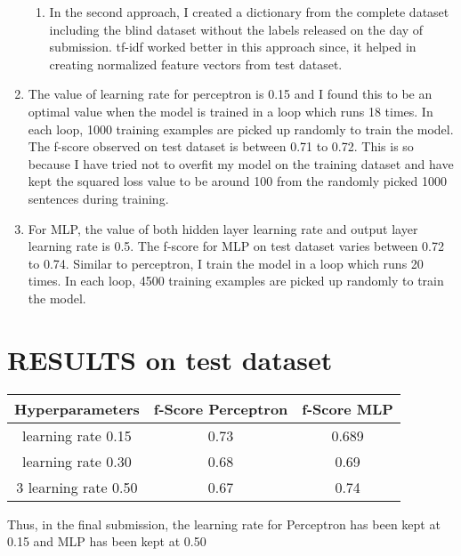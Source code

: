 \documentclass[12pt]{article}
\begin{document}
\begin{enumerate}[label=(\alph*)]
\begin{enumerate}
    \item In the second approach, I created a dictionary from the complete dataset including the blind dataset without the labels released on the day of submission. tf-idf worked better in this approach since, it helped in creating normalized feature vectors from test dataset.
    \end{enumerate}   
    \item The value of learning rate for perceptron is 0.15 and I found this to be an optimal value when the model is trained in a loop which runs 18 times. In each loop, 1000 training examples are picked up randomly to train the model. The f-score observed on test dataset is between 0.71 to 0.72. This is so because I have tried not to overfit my model on the training dataset and have kept the squared loss value to be around 100 from the randomly picked 1000 sentences during training.
    \item For MLP, the value of both hidden layer learning rate and output layer learning rate is 0.5. The f-score for MLP on test dataset varies between 0.72 to 0.74. Similar to perceptron, I train the model in a loop which runs 20 times. In each loop, 4500 training examples are picked up randomly to train the model.
  \end{enumerate}
  \section*{RESULTS on test dataset}
  \begin{center}
 \begin{tabular}{||c c c||} 
 \hline
 Hyperparameters & f-Score Perceptron & f-Score MLP \\ [0.5ex] 
 \hline\hline
  learning rate 0.15 & 0.73 & 0.689 \\ 
 \hline
 learning rate 0.30 & 0.68 & 0.69 \\
 \hline
 3
 learning rate 0.50 & 0.67 & 0.74 \\ [1ex]
 \hline
\end{tabular}
\end{center}

 Thus, in the final submission, the learning rate for Perceptron has been kept at 0.15 and MLP has been kept at 0.50
\end{document}
